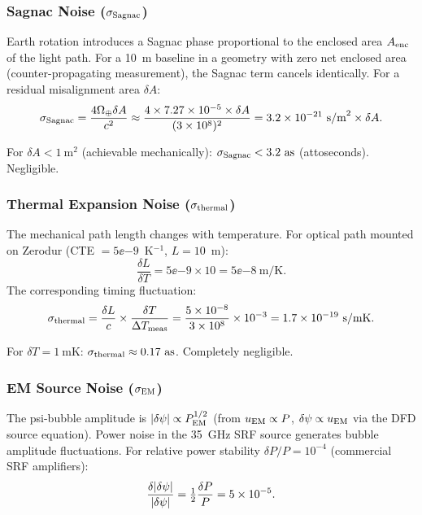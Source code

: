 \subsubsection{Sagnac Noise ($\sigma_{\rm Sagnac}$)}

Earth rotation introduces a Sagnac phase proportional to the enclosed area
$A_{\rm enc}$ of the light path. For a 10~m baseline in a geometry with zero
net enclosed area (counter-propagating measurement), the Sagnac term cancels
identically. For a residual misalignment area $\delta A$:
\begin{equation}
\sigma_{\rm Sagnac} = \frac{4\Omega_\oplus \delta A}{c^2}
\approx \frac{4\times7.27\times 10^{-5}\times\delta A}{(3\times 10^{8})^2}
= 3.2\times 10^{-21}~\text{s/m}^2 \times \delta A.
\label{eq:sagnac}
\end{equation}

For $\delta A < 1~\text{m}^2$ (achievable mechanically): $\sigma_{\rm Sagnac}
< 3.2~\text{as}$ (attoseconds). Negligible.

\subsubsection{Thermal Expansion Noise ($\sigma_{\rm thermal}$)}

The mechanical path length changes with temperature. For optical path mounted
on Zerodur (CTE $= 5\ee{-9}$~K$^{-1}$, $L = 10$~m):
\begin{equation}
\frac{\delta L}{\delta T} = 5\ee{-9}\times10 = 5\ee{-8}~\text{m/K}.
\label{eq:zerodur_cte}
\end{equation}
The corresponding timing fluctuation:
\begin{equation}
\sigma_{\rm thermal} = \frac{\delta L}{c} \times \frac{\delta T}{\Delta T_{\rm meas}}
= \frac{5\times 10^{-8}}{3\times 10^{8}} \times 10^{-3} = 1.7\times 10^{-19}~\text{s/mK}.
\label{eq:thermal_timing}
\end{equation}

For $\delta T = 1~\text{mK}$: $\sigma_{\rm thermal} \approx 0.17~\text{as}$.
Completely negligible.

\subsubsection{EM Source Noise ($\sigma_{\rm EM}$)}

The psi-bubble amplitude is $|\delta\psi| \propto P_{\rm EM}^{1/2}$ (from
$u_{\rm EM} \propto P$, $\delta\psi \propto u_{\rm EM}$ via the DFD source equation).
Power noise in the 35~GHz SRF source generates bubble amplitude fluctuations.
For relative power stability $\delta P/P = 10^{-4}$ (commercial SRF
amplifiers):
\begin{equation}
\frac{\delta|\delta\psi|}{|\delta\psi|} = \tfrac{1}{2}\frac{\delta P}{P} = 5\times 10^{-5}.
\label{eq:EM_stability}
\end{equation}

